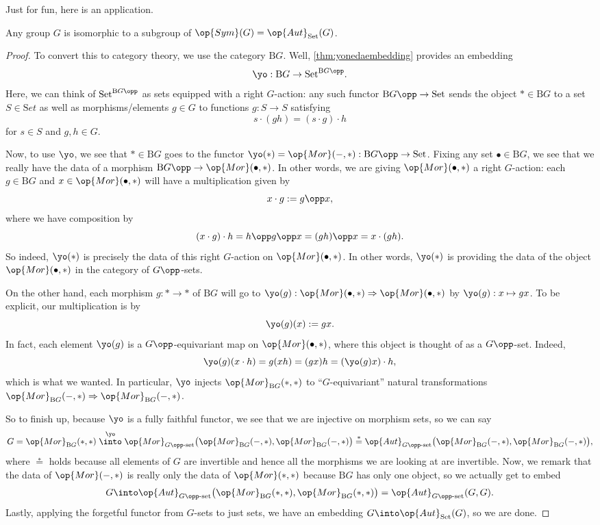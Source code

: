 \documentclass[../notes.tex]{subfiles}
\begin{document}
Just for fun, here is an application.
\begin{corollary}
	Any group $G$ is isomorphic to a subgroup of $\op{Sym}(G)=\op{Aut}_{\mathrm{Set}}(G)$.
\end{corollary}
\begin{proof}
	To convert this to category theory, we use the category $\mathrm BG$. Well, \autoref{thm:yonedaembedding} provides an embedding
	\[\yo:\mathrm BG\to\mathrm{Set}^{\mathrm BG\opp}.\]
	Here, we can think of $\mathrm{Set}^{\mathrm BG\opp}$ as sets equipped with a right $G$-action: any such functor $\mathrm BG\opp\to\mathrm{Set}$ sends the object $*\in\mathrm BG$ to a set $S\in\mathrm Set$ as well as morphisms/elements $g\in G$ to functions $g:S\to S$ satisfying
	\[s\cdot(gh)=(s\cdot g)\cdot h\]
	for $s\in S$ and $g,h\in G$.

	Now, to use $\yo$, we see that $*\in\mathrm BG$ goes to the functor $\yo(*)=\op{Mor}(-,*):\mathrm BG\opp\to\mathrm{Set}$. Fixing any set $\bullet\in\mathrm BG$, we see that we really have the data of a morphism $\mathrm BG\opp\to\op{Mor}(\bullet,*)$. In other words, we are giving $\op{Mor}(\bullet,*)$ a right $G$-action: each $g\in\mathrm BG$ and $x\in\op{Mor}(\bullet,*)$ will have a multiplication given by
	\[x\cdot g:=g\opp x,\]
	where we have composition by
	\[(x\cdot g)\cdot h=h\opp g\opp x=(gh)\opp x=x\cdot(gh).\]
	So indeed, $\yo(*)$ is precisely the data of this right $G$-action on $\op{Mor}(\bullet,*)$. In other words, $\yo(*)$ is providing the data of the object $\op{Mor}(\bullet,*)$ in the category of $G\opp$-sets.
	
	On the other hand, each morphism $g:*\to *$ of $\mathrm BG$ will go to $\yo(g):\op{Mor}(\bullet,*)\Rightarrow\op{Mor}(\bullet,*)$ by $\yo(g):x\mapsto gx$. To be explicit, our multiplication is by
	\[\yo(g)(x):=gx.\]
	In fact, each element $\yo(g)$ is a $G\opp$-equivariant map on $\op{Mor}(\bullet,*)$, where this object is thought of as a $G\opp$-set. Indeed,
	\[\yo(g)(x\cdot h)=g(xh)=(gx)h=(\yo(g)x)\cdot h,\]
	which is what we wanted. In particular, $\yo$ injects $\op{Mor}_{\mathrm BG}(*,*)$ to ``$G$-equivariant'' natural transformations $\op{Mor}_{\mathrm BG}(-,*)\Rightarrow\op{Mor}_{\mathrm BG}(-,*)$.

	So to finish up, because $\yo$ is a fully faithful functor, we see that we are injective on morphism sets, so we can say
	\[G=\op{Mor}_{\mathrm BG}(*,*)\stackrel{\yo}\into\op{Mor}_{G\opp\text{-set}}\big(\op{Mor}_{\mathrm BG}(-,*),\op{Mor}_{\mathrm BG}(-,*)\big)\stackrel*=\op{Aut}_{G\opp\text{-set}}\big(\op{Mor}_{\mathrm BG}(-,*),\op{Mor}_{\mathrm BG}(-,*)\big),\]
	where $\stackrel*=$ holds because all elements of $G$ are invertible and hence all the morphisms we are looking at are invertible. Now, we remark that the data of $\op{Mor}(-,*)$ is really only the data of $\op{Mor}(*,*)$ because $\mathrm BG$ has only one object, so we actually get to embed
	\[G\into\op{Aut}_{G\opp\text{-set}}\big(\op{Mor}_{\mathrm BG}(*,*),\op{Mor}_{\mathrm BG}(*,*)\big)=\op{Aut}_{G\opp\text{-set}}(G,G).\]
	Lastly, applying the forgetful functor from $G$-sets to just sets, we have an embedding $G\into\op{Aut}_{\mathrm{Set}}(G)$, so we are done.
\end{proof}
\end{document}
